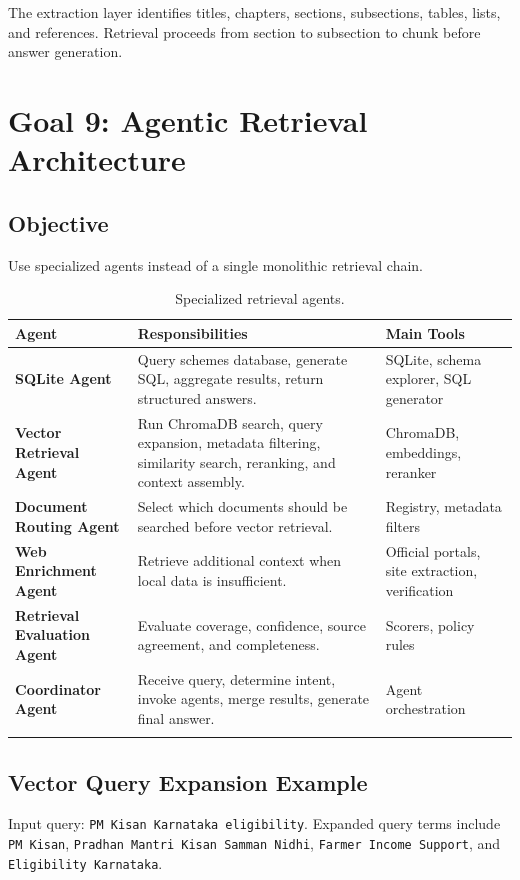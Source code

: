 \documentclass[11pt]{article}
\begin{document}
The extraction layer identifies titles, chapters, sections, subsections, tables, lists,
and references. Retrieval proceeds from section to subsection to chunk before answer
generation.

\section{Goal 9: Agentic Retrieval Architecture}

\subsection{Objective}
Use specialized agents instead of a single monolithic retrieval chain.

\begin{longtable}{>{\bfseries}p{}p{}p{}}
\toprule
Agent & Responsibilities & Main Tools \\
\midrule
SQLite Agent & Query schemes database, generate SQL, aggregate results, return structured answers. & SQLite, schema explorer, SQL generator \\
Vector Retrieval Agent & Run ChromaDB search, query expansion, metadata filtering, similarity search, reranking, and context assembly. & ChromaDB, embeddings, reranker \\
Document Routing Agent & Select which documents should be searched before vector retrieval. & Registry, metadata filters \\
Web Enrichment Agent & Retrieve additional context when local data is insufficient. & Official portals, site extraction, verification \\
Retrieval Evaluation Agent & Evaluate coverage, confidence, source agreement, and completeness. & Scorers, policy rules \\
Coordinator Agent & Receive query, determine intent, invoke agents, merge results, generate final answer. & Agent orchestration \\
\bottomrule
\caption{Specialized retrieval agents.}
\end{longtable}

\subsection{Vector Query Expansion Example}
Input query: \texttt{PM Kisan Karnataka eligibility}. Expanded query terms include
\texttt{PM Kisan}, \texttt{Pradhan Mantri Kisan Samman Nidhi}, \texttt{Farmer Income
Support}, and \texttt{Eligibility Karnataka}.
\end{document}
